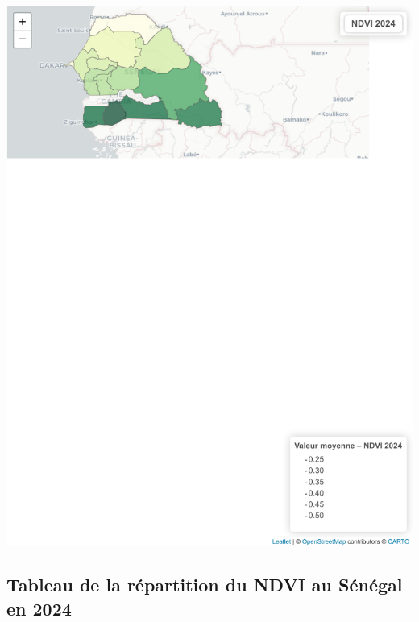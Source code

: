 \documentclass[
]{book}
\begin{document}
\includegraphics{Atlas-Spectral-Sahel_files/figure-latex/vegetation-ndvi-1.pdf}

\subsection{Tableau de la répartition du NDVI au Sénégal en 2024}\label{tableau-de-la-ruxe9partition-du-ndvi-au-suxe9nuxe9gal-en-2024}
\end{document}
